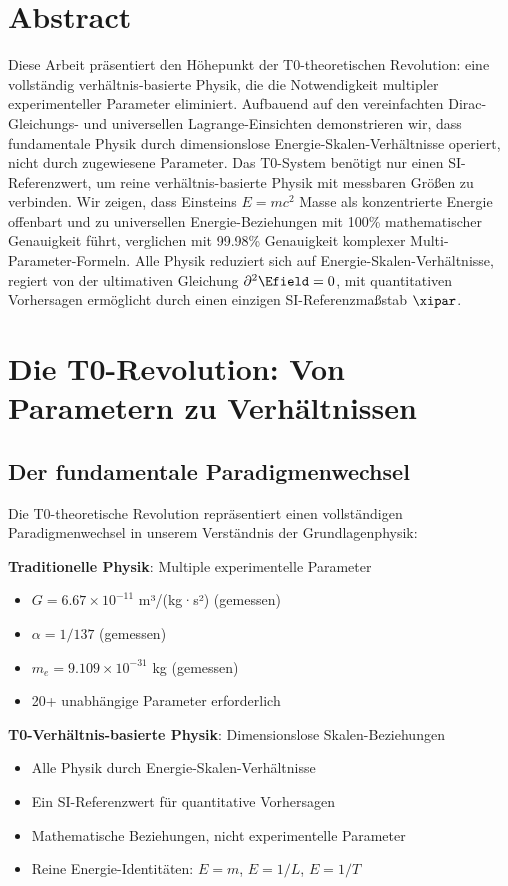 \section*{Abstract}
		Diese Arbeit präsentiert den Höhepunkt der T0-theoretischen Revolution: eine vollständig verhältnis-basierte Physik, die die Notwendigkeit multipler experimenteller Parameter eliminiert. Aufbauend auf den vereinfachten Dirac-Gleichungs- und universellen Lagrange-Einsichten demonstrieren wir, dass fundamentale Physik durch dimensionslose Energie-Skalen-Verhältnisse operiert, nicht durch zugewiesene Parameter. Das T0-System benötigt nur einen SI-Referenzwert, um reine verhältnis-basierte Physik mit messbaren Größen zu verbinden. Wir zeigen, dass Einsteins $E = mc^2$ Masse als konzentrierte Energie offenbart und zu universellen Energie-Beziehungen mit 100\% mathematischer Genauigkeit führt, verglichen mit 99.98\% Genauigkeit komplexer Multi-Parameter-Formeln. Alle Physik reduziert sich auf Energie-Skalen-Verhältnisse, regiert von der ultimativen Gleichung $\partial^2 \Efield = 0$, mit quantitativen Vorhersagen ermöglicht durch einen einzigen SI-Referenzmaßstab $\xipar$.

	
	
	\section{Die T0-Revolution: Von Parametern zu Verhältnissen}
	
	\subsection{Der fundamentale Paradigmenwechsel}
	
	Die T0-theoretische Revolution repräsentiert einen vollständigen Paradigmenwechsel in unserem Verständnis der Grundlagenphysik:
	
	\begin{tcolorbox}[colback=red!5!white,colframe=red!75!black,title=Paradigma-Revolution]
		\textbf{Traditionelle Physik}: Multiple experimentelle Parameter
		\begin{itemize}
			\item $G = 6.67 \times 10^{-11}$ m³/(kg·s²) (gemessen)
			\item $\alpha = 1/137$ (gemessen)
			\item $m_e = 9.109 \times 10^{-31}$ kg (gemessen)
			\item 20+ unabhängige Parameter erforderlich
		\end{itemize}
		
		\textbf{T0-Verhältnis-basierte Physik}: Dimensionslose Skalen-Beziehungen
		\begin{itemize}
			\item Alle Physik durch Energie-Skalen-Verhältnisse
			\item Ein SI-Referenzwert für quantitative Vorhersagen
			\item Mathematische Beziehungen, nicht experimentelle Parameter
			\item Reine Energie-Identitäten: $E = m$, $E = 1/L$, $E = 1/T$
		\end{itemize}
	\end{tcolorbox}
	
